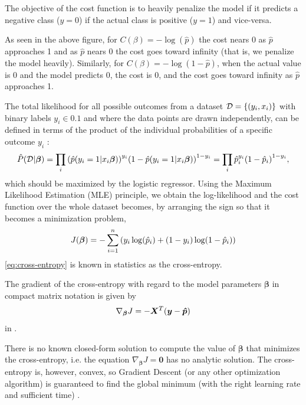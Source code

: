 The objective of the cost function is to heavily penalize the model if it predicts a negative class ($y=0$) if the actual class is positive ($y=1$) and vice-versa. \cite{Hands-onML}

As seen in the above figure, for $C(\beta) = - \log(\hat{p})$ the cost nears 0 as $\hat{p}$ approaches 1 and as $\hat{p}$ nears 0 the cost goes toward infinity (that is, we penalize the model heavily). Similarly, for $C(\beta) = - \log(1 - \hat{p})$, when the actual value is 0 and the model predicts 0, the cost is 0, and the cost goes toward infinity as $\hat{p}$ approaches 1.

The total likelihood for all possible outcomes from a dataset $\mathcal{D} = \qty{\qty(y_i, x_i)}$ with binary labels $y_i \in \qty{0,1}$ and where the data points are drawn independently, can be defined in terms of the product of the individual probabilities of a specific outcome $y_i$ \cite{logreglec}:
\begin{equation}
    \hat{P} (\mathcal{D} | \bm{\beta}) = \prod_i \qty(\hat{p}\qty(y_i = 1 | x_i \bm{\beta}))^{y_i} \qty(1 - \hat{p}\qty(y_i = 1 | x_i \bm{\beta}))^{1-y_i} = \prod_i \hat{p}_i^{y_i} \qty(1 - \hat{p}_i)^{1-y_i},
\end{equation}
which should be maximized by the logistic regressor. Using the Maximum Likelihood Estimation (MLE) principle, we obtain the log-likelihood and the cost function over the whole dataset becomes, by arranging the sign so that it becomes a minimization problem,
\begin{equation}\label{eq:cross-entropy}
    J (\bm{\beta}) = - \sum_{i=1}^n \qty(y_i \log(\hat{p}_i) + (1-y_i) \log(1 - \hat{p}_i) )
\end{equation}
\autoref{eq:cross-entropy} is known in statistics as the cross-entropy.

The gradient of the cross-entropy with regard to the model parameters $\bm{\beta}$ in compact matrix notation is given by
\begin{equation}\label{eq:logcost deriv}
    \nabla_{\bm{\beta}} J = -\bm{X}^T \qty(\bm{y} -\bm{\hat{p}})
\end{equation}
in \cite{logreglec}.

There is no known closed-form solution to compute the value of $\bm{\beta}$ that minimizes the cross-entropy, i.e. the equation $\nabla_{\bm{\beta}} J = \bm{0}$ has no analytic solution. The cross-entropy is, however, convex, so Gradient Descent (or any other optimization algorithm) is guaranteed to find the global minimum (with the right learning rate and sufficient time) \cite{Hands-onML}.

